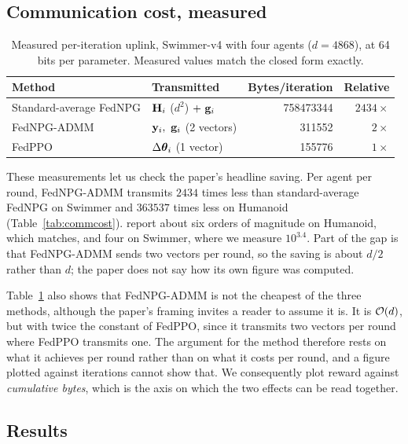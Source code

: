 \subsection{Communication cost, measured}

\begin{table}[t]
  \centering
  \caption{Measured per-iteration uplink, Swimmer-v4 with four agents
  ($d = \num{4868}$), at 64 bits per parameter. Measured values match the closed
  form exactly.}
  \label{tab:measuredcomm}
  \begin{tabular}{llrr}
    \toprule
    Method & Transmitted & Bytes/iteration & Relative \\
    \midrule
    Standard-average FedNPG & $\mathbf{H}_i$ ($d^2$) $+\ \mathbf{g}_i$ & \num{758473344} & $2434\times$ \\
    FedNPG-ADMM             & $\by_i,\ \bg_i$ (2 vectors) & \num{311552}   & $2\times$ \\
    FedPPO                  & $\Delta\boldsymbol{\theta}_i$ (1 vector)  & \num{155776}   & $1\times$ \\
    \bottomrule
  \end{tabular}
\end{table}

These measurements let us check the paper's headline saving. Per agent per
round, FedNPG-ADMM transmits $\num{2434}$ times less than standard-average
FedNPG on Swimmer and $\num{363537}$ times less on Humanoid
(Table~\ref{tab:commcost}). \citet{lan2023fednpgadmm} report about six orders
of magnitude on Humanoid, which matches, and four on Swimmer, where we measure
$10^{3.4}$. Part of the gap is that FedNPG-ADMM sends two vectors per round,
so the saving is about $d/2$ rather than $d$; the paper does not say how its
own figure was computed.

Table~\ref{tab:measuredcomm} also shows that FedNPG-ADMM is not the cheapest
of the three methods, although the paper's framing invites a reader to assume
it is. It is $\mathcal{O}(d)$, but with twice the constant of
FedPPO, since it transmits two vectors per round where FedPPO transmits one.
The argument for the method therefore rests on what it achieves per round
rather than on what it costs per round, and a figure plotted against iterations
cannot show that. We consequently plot reward against \emph{cumulative bytes},
which is the axis on which the two effects can be read together.

\subsection{Results}

